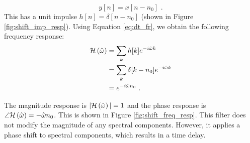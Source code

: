 \begin{equation}
y[n] = x[n-n_0] \,\,.
\end{equation}
This has a unit impulse $h[n]=\delta[n-n_0]$ (shown in
Figure \ref{fig:shift_imp_resp}). Using Equation \ref{eq:dt_fr}, we
obtain the following frequency response:
\begin{align}
\mathcal{H}\left(\hat{\omega}\right) & = \sum_k h[k] e^{-i\hat{\omega}k}\\
    & = \sum_k \delta[k-n_0] e^{-i\hat{\omega}k}\\
    & = e^{-i\hat{\omega}n_0} \,\,.
\end{align}

The magnitude response is $|\mathcal{H}\left(\hat{\omega}\right)|=1$ and the phase response is
$\angle \mathcal{H}\left(\hat{\omega}\right) = -\hat{\omega}n_0$. This is shown in
Figure \ref{fig:shift_freq_resp}. This filter does not modify the
magnitude of any spectral components. However, it applies a phase
shift to spectral components, which results in a time delay.

